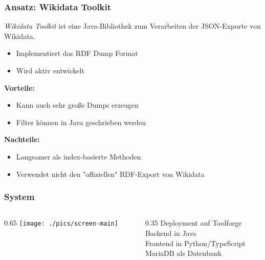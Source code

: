 \documentclass[aspectratio=1609,xcolor=usenames,dvipsnames,svgnames]{beamer}
\begin{document}
\begin{frame}\frametitle{Ansatz: Wikidata Toolkit}
  \emph{Wikidata Toolkit} ist eine Java-Bibliothek zum Verarbeiten der JSON-Exporte von Wikidata.
  \begin{itemize}
      \item Implementiert das RDF Dump Format
      \item Wird aktiv entwickelt
  \end{itemize}

  \textbf{Vorteile:}
  \begin{itemize}
    \item Kann auch sehr große Dumps erzeugen
    \item Filter können in Java geschrieben werden

  \end{itemize}

  \textbf{Nachteile:}
  \begin{itemize}
      \item Langsamer als index-basierte Methoden
      \item Verwendet nicht den "offiziellen" RDF-Export von Wikidata
  \end{itemize}


\end{frame}

\begin{frame}\frametitle{System}
  \begin{figure}
    
  \end{figure}
\end{frame}

\begin{frame}
  \centering
  \begin{columns}
    \begin{column}{0.65\framewidth}
      \texttt{[image: ./pics/screen-main]}
    \end{column}
    \begin{column}{0.35\framewidth}
      Deployment auf Toolforge \\
      \vspace{0.5cm}
      Backend in Java \\
      \vspace{0.5cm}
      Frontend in Python/TypeScript \\
      \vspace{0.5cm}
      MariaDB als Datenbank \\
      \vspace{0.5cm}
      \hspace{-110pt}
    \end{column}
  \end{columns}
\end{frame}
\end{document}
